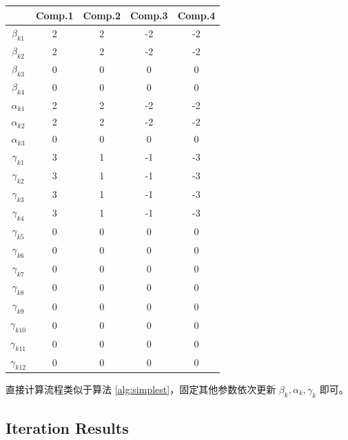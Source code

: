 \documentclass[12pt, a4paper, oneside]{article}
\numberwithin{equation}{section}
\begin{document}
\begin{table}[h]
	\centering
	\begin{tabular}{ccccc}
		\toprule
		& Comp.1 & Comp.2 & Comp.3 & Comp.4 \\
		\midrule
		$\beta_{k1}$   & 2      & 2      & -2     & -2     \\
		$\beta_{k2}$   & 2      & 2      & -2     & -2     \\
		$\beta_{k3}$   & 0      & 0      & 0      & 0      \\
		$\beta_{k4}$   & 0      & 0      & 0      & 0      \\
		\midrule
		$\alpha_{k1}$  & 2      & 2      & -2     & -2     \\
		$\alpha_{k2}$  & 2      & 2      & -2     & -2     \\
		$\alpha_{k3}$  & 0      & 0      & 0      & 0      \\
		\midrule
		$\gamma_{k1}$  & 3      & 1      & -1     & -3     \\
		$\gamma_{k2}$  & 3      & 1      & -1     & -3     \\
		$\gamma_{k3}$  & 3      & 1      & -1     & -3     \\
		$\gamma_{k4}$  & 3      & 1      & -1     & -3     \\
		$\gamma_{k5}$  & 0      & 0      & 0      & 0      \\
		$\gamma_{k6}$  & 0      & 0      & 0      & 0      \\
		$\gamma_{k7}$  & 0      & 0      & 0      & 0      \\
		$\gamma_{k8}$  & 0      & 0      & 0      & 0      \\
		$\gamma_{k9}$  & 0      & 0      & 0      & 0      \\
		$\gamma_{k10}$ & 0      & 0      & 0      & 0      \\
		$\gamma_{k11}$ & 0      & 0      & 0      & 0      \\
		$\gamma_{k12}$ & 0      & 0      & 0      & 0     \\
		\bottomrule
	\end{tabular}
	\label{tb:coef_true}
\end{table}

直接计算流程类似于算法 \ref{alg:simplest}，固定其他参数依次更新 $\beta_k, \alpha_k, \gamma_k$ 即可。

\subsection{Iteration Results}
\end{document}
